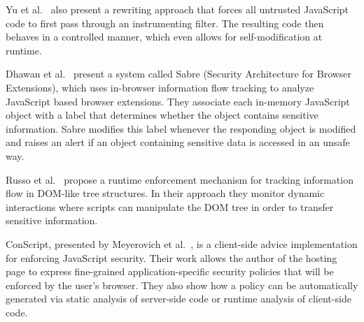 Yu et al.~\cite{1190252} also present a rewriting approach that forces all untrusted JavaScript code to first pass through an instrumenting filter.
The resulting code then behaves in a controlled manner, which even allows for self-modification at runtime.

Dhawan et al.~\cite{1723250} present a system called Sabre (Security Architecture for Browser Extensions), which uses in-browser information flow tracking to analyze JavaScript based browser extensions.
They associate each in-memory JavaScript object with a label that determines whether the object contains sensitive information.
Sabre modifies this label whenever the responding object is modified and raises an alert if an object containing sensitive data is accessed in an unsafe way.

Russo et al.~\cite{1813092} propose a runtime enforcement mechanism for tracking information flow in DOM-like tree structures.
In their approach they monitor dynamic interactions where scripts can manipulate the DOM tree in order to transfer sensitive information.

ConScript, presented by Meyerovich et al.~\cite{5504806}, is a client-side advice implementation for enforcing JavaScript security.
Their work allows the author of the hosting page to express fine-grained application-specific security policies that will be enforced by the user's browser.
They also show how a policy can be automatically generated via static analysis of server-side code or runtime analysis of client-side code.




